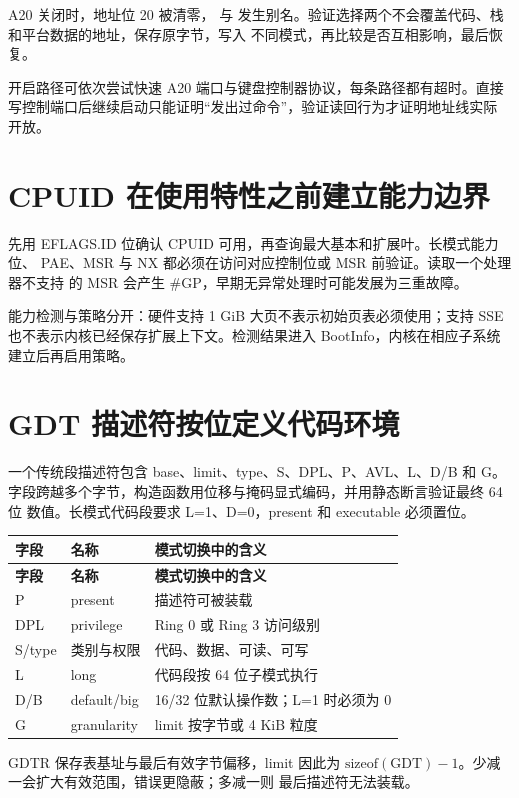 A20 关闭时，地址位 20 被清零， 与 
发生别名。验证选择两个不会覆盖代码、栈和平台数据的地址，保存原字节，写入
不同模式，再比较是否互相影响，最后恢复。

开启路径可依次尝试快速 A20 端口与键盘控制器协议，每条路径都有超时。直接
写控制端口后继续启动只能证明“发出过命令”，验证读回行为才证明地址线实际
开放。

\section{CPUID 在使用特性之前建立能力边界}

先用 EFLAGS.ID 位确认 CPUID 可用，再查询最大基本和扩展叶。长模式能力位、
PAE、MSR 与 NX 都必须在访问对应控制位或 MSR 前验证。读取一个处理器不支持
的 MSR 会产生 \#GP，早期无异常处理时可能发展为三重故障。

能力检测与策略分开：硬件支持 1 GiB 大页不表示初始页表必须使用；支持 SSE
也不表示内核已经保存扩展上下文。检测结果进入 BootInfo，内核在相应子系统
建立后再启用策略。

\section{GDT 描述符按位定义代码环境}

一个传统段描述符包含 base、limit、type、S、DPL、P、AVL、L、D/B 和 G。
字段跨越多个字节，构造函数用位移与掩码显式编码，并用静态断言验证最终 64 位
数值。长模式代码段要求 L=1、D=0，present 和 executable 必须置位。

\begin{longtable}{L{0.14\textwidth}L{0.24\textwidth}L{0.48\textwidth}}
\toprule
\textbf{字段} & \textbf{名称} & \textbf{模式切换中的含义}\\
\midrule
\endfirsthead
\toprule
\textbf{字段} & \textbf{名称} & \textbf{模式切换中的含义}\\
\midrule
\endhead
P & present & 描述符可被装载\\
DPL & privilege & Ring 0 或 Ring 3 访问级别\\
S/type & 类别与权限 & 代码、数据、可读、可写\\
L & long & 代码段按 64 位子模式执行\\
D/B & default/big & 16/32 位默认操作数；L=1 时必须为 0\\
G & granularity & limit 按字节或 4 KiB 粒度\\
\bottomrule
\end{longtable}

GDTR 保存表基址与最后有效字节偏移，limit 因此为
\(\mathrm{sizeof(GDT)}-1\)。少减一会扩大有效范围，错误更隐蔽；多减一则
最后描述符无法装载。

